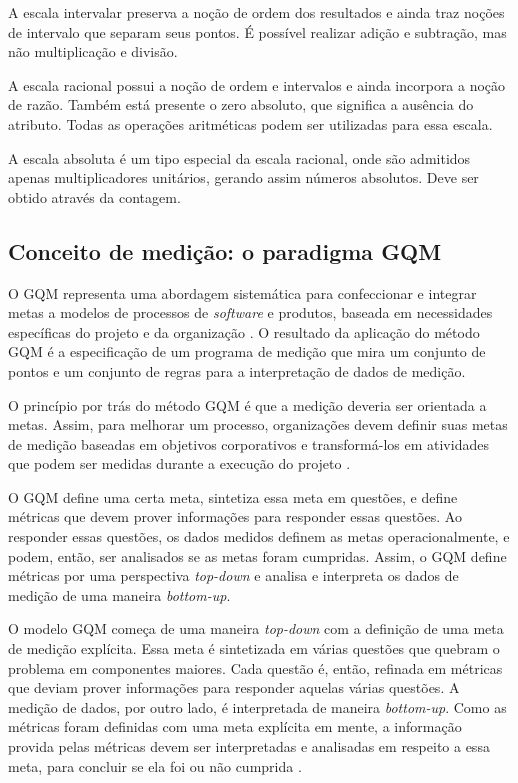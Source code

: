 A escala intervalar preserva a noção de ordem dos resultados e ainda traz noções
de intervalo que separam seus pontos. É possível realizar adição e subtração, mas
não multiplicação e divisão.

A escala racional possui a noção de ordem e intervalos e ainda incorpora a noção
de razão. Também está presente o zero absoluto, que significa a ausência do atributo.
Todas as operações aritméticas podem ser utilizadas para essa escala.

A escala absoluta é um tipo especial da escala racional, onde são admitidos apenas
multiplicadores unitários, gerando assim números absolutos. Deve ser obtido
através da contagem.


\subsection{Conceito de medição: o paradigma GQM}
O GQM representa uma abordagem sistemática para confeccionar e integrar metas a
modelos de processos de \textit{software} e produtos, baseada em necessidades específicas
do projeto e da organização \cite{basiliRombach}. O resultado da aplicação do
método GQM é a especificação de um programa de medição que mira um conjunto de
pontos e um conjunto de regras para a interpretação de dados de medição.

O princípio por trás do método GQM é que a medição deveria ser orientada a metas.
Assim, para melhorar um processo, organizações devem definir suas metas de medição
baseadas em objetivos corporativos e transformá-los em atividades que podem ser
 medidas durante a execução do projeto \cite{egon}.

O GQM define uma certa meta, sintetiza essa meta em questões, e define métricas
que devem prover informações para responder essas questões. Ao responder essas
questões, os dados medidos definem as metas operacionalmente, e podem, então,
ser analisados se as metas foram cumpridas. Assim, o GQM define métricas por uma
perspectiva \textit{top-down} e analisa e interpreta os dados de medição de uma maneira
\textit{bottom-up}.

O modelo GQM começa de uma maneira \textit{top-down} com a definição de uma meta de medição
explícita. Essa meta é sintetizada em várias questões que quebram o problema em
componentes maiores. Cada questão é, então, refinada em métricas que deviam prover
informações para responder aquelas várias questões. A medição de dados, por outro
lado, é interpretada de maneira \textit{bottom-up}. Como as métricas foram definidas com
uma meta explícita em mente, a informação provida pelas métricas devem ser
interpretadas e analisadas em respeito a essa meta, para concluir se ela foi
ou não cumprida \cite{egon}.
